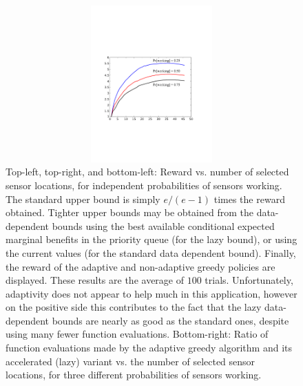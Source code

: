 {\begin{figure}[p]
\begin{minipage}[b]{0.5\linewidth}
\centering
\includegraphics[width=1.0\textwidth, height=6cm]{figs/Berkeley_evals}
\end{minipage}
\caption{
Top-left, top-right, and bottom-left:
Reward vs. number of selected sensor locations, for
  independent probabilities of sensors working.  The standard upper
  bound is simply $e/(e-1)$ times the reward obtained.  Tighter upper
  bounds may be obtained from the data-dependent bounds using 
  the best available conditional expected marginal benefits in the
  priority queue (for the lazy bound), or using the current values
 (for the standard data dependent bound).  Finally, the reward of the
 adaptive and non-adaptive greedy policies are displayed.  
 These results are the average of $100$ trials.  Unfortunately,
 adaptivity does not appear to help much in this application, however
 on the positive side this contributes to the fact that the lazy data-dependent bounds
 are nearly as good as the standard ones, despite using many fewer
 function evaluations.
Bottom-right: Ratio of function evaluations made by the adaptive greedy
  algorithm and its accelerated (lazy) variant vs. the number of
  selected sensor locations,  for three different
  probabilities of sensors working. 
}
\label{fig:temp-data-rewards}
\end{figure}
} %



%
%
%
%
